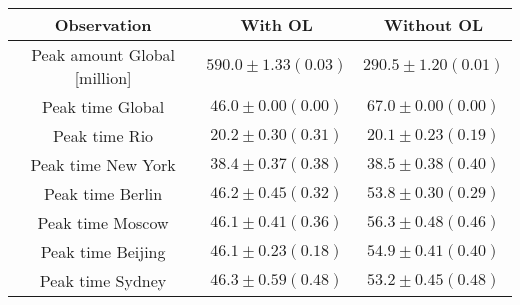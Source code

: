 \begin{tabular}[H]{c | c | c}
Observation & With OL & Without OL \\ \hline 
 Peak amount Global [million]& $590.0\pm 1.33 (0.03)$ & $290.5 \pm 1.20 (0.01)$\\ 
 Peak time Global & $46.0\pm 0.00( 0.00)$ & $67.0 \pm 0.00 (0.00)$\\ 
 Peak time Rio & $20.2\pm 0.30( 0.31)$ & $20.1 \pm 0.23 (0.19)$\\ 
 Peak time New York & $38.4\pm 0.37( 0.38)$ & $38.5 \pm 0.38 (0.40)$\\ 
 Peak time Berlin & $46.2\pm 0.45( 0.32)$ & $53.8 \pm 0.30 (0.29)$\\ 
 Peak time Moscow & $46.1\pm 0.41( 0.36)$ & $56.3 \pm 0.48 (0.46)$\\ 
 Peak time Beijing & $46.1\pm 0.23( 0.18)$ & $54.9 \pm 0.41 (0.40)$\\ 
 Peak time Sydney & $46.3\pm 0.59( 0.48)$ & $53.2 \pm 0.45 (0.48)$
\end{tabular}